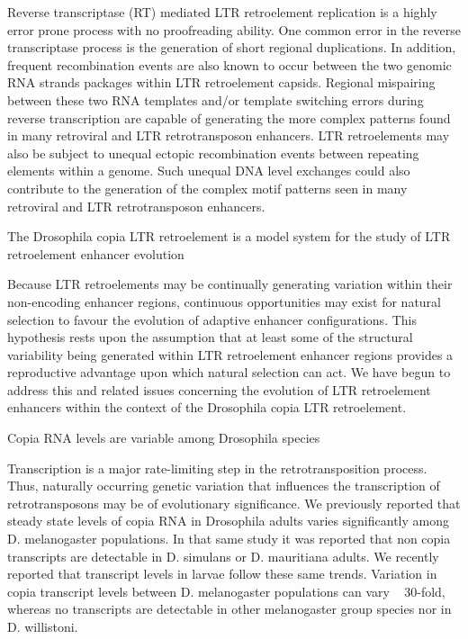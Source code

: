 Reverse transcriptase (RT) mediated LTR retroelement replication is a highly error prone process with no proofreading ability. One common error in the reverse transcriptase process is the generation of short regional duplications. In addition, frequent recombination events are also known to occur between the two genomic RNA strands packages within LTR retroelement capsids. Regional mispairing between these two RNA templates and/or template switching errors during reverse transcription are capable of generating the more complex patterns found in many retroviral and LTR retrotransposon enhancers. LTR retroelements may also be subject to unequal ectopic recombination events between repeating elements within a genome. Such unequal DNA level exchanges could also contribute to the generation of the complex motif patterns seen in many retroviral and LTR retrotransposon enhancers.

The Drosophila copia LTR retroelement is a model system for the study of LTR retroelement enhancer evolution

Because LTR retroelements may be continually generating variation within their non-encoding enhancer regions, continuous opportunities may exist for natural selection to favour the evolution of adaptive enhancer configurations. This hypothesis rests upon the assumption that at least some of the structural variability being generated within LTR retroelement enhancer regions provides a reproductive advantage upon which natural selection can act. We have begun to address this and related issues concerning the evolution of LTR retroelement enhancers within the context of the Drosophila copia LTR retroelement.

Copia RNA levels are variable among Drosophila species

Transcription is a major rate-limiting step in the retrotransposition process. Thus, naturally occurring genetic variation that influences the transcription of retrotransposons may be of evolutionary significance. We previously reported that steady state levels of copia RNA in Drosophila adults varies significantly among D. melanogaster populations. In that same study it was reported that non copia transcripts are detectable in D. simulans or D. mauritiana adults. We recently reported that transcript levels in larvae follow these same trends. Variation in copia transcript levels between D. melanogaster populations can vary ~ 30-fold, whereas no transcripts are detectable in other melanogaster group species nor in D. willistoni.

